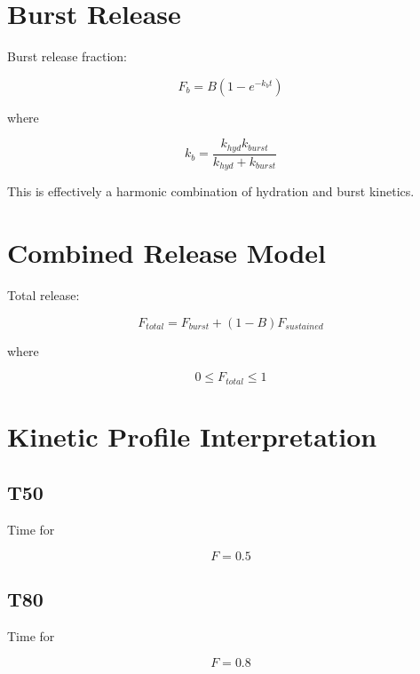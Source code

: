 \documentclass[11pt]{article}
\begin{document}
\section{Burst Release}

Burst release fraction:

\begin{equation}
F_b=B\left(1-e^{-k_bt}\right)
\end{equation}

where

\begin{equation}
k_b
=
\frac{k_{hyd}k_{burst}}
{k_{hyd}+k_{burst}}
\end{equation}

This is effectively a harmonic combination of hydration and burst kinetics.

\section{Combined Release Model}

Total release:

\begin{equation}
F_{total}
=
F_{burst}
+
(1-B)F_{sustained}
\end{equation}

where

\begin{equation}
0\le F_{total}\le1
\end{equation}

\section{Kinetic Profile Interpretation}

\subsection{T50}

Time for

\begin{equation}
F=0.5
\end{equation}

\subsection{T80}

Time for

\begin{equation}
F=0.8
\end{equation}
\end{document}
